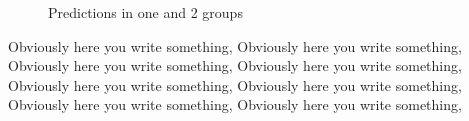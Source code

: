 \documentclass{article}
\begin{document}
\begin{figure}[ht]
    \centering
    \quad
    \quad
    \caption{Predictions in one and 2 groups}
\end{figure}

Obviously here you write something, Obviously here you write something, Obviously here you write something, Obviously here you write something, Obviously here you write something, Obviously here you write something, Obviously here you write something, Obviously here you write something, 
\end{document}
